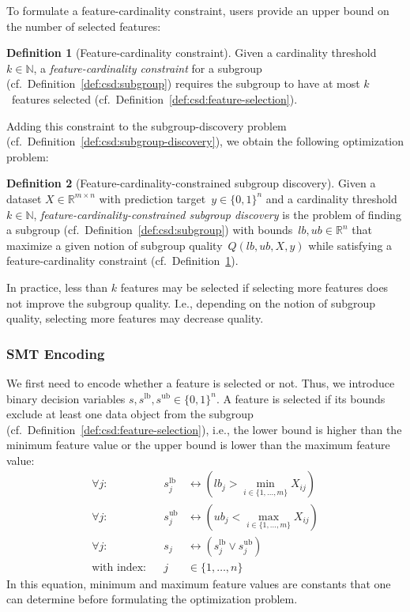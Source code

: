 \documentclass{article}
\theoremstyle{definition}
\newtheorem{definition}{Definition}
\begin{document}
To formulate a feature-cardinality constraint, users provide an upper bound on the number of selected features:
%
\begin{definition}[Feature-cardinality constraint]
	Given a cardinality threshold $k \in \mathbb{N}$,
	a \emph{feature-cardinality constraint} for a subgroup (cf.~Definition~\ref{def:csd:subgroup}) requires the subgroup to have at most $k$~features selected (cf.~Definition~\ref{def:csd:feature-selection}).
	\label{def:csd:feature-cardinality-constraint}
\end{definition}
%
Adding this constraint to the subgroup-discovery problem (cf.~Definition~\ref{def:csd:subgroup-discovery}), we obtain the following optimization problem:
%
\begin{definition}[Feature-cardinality-constrained subgroup discovery]
	Given a dataset $X \in \mathbb{R}^{m \times n}$ with prediction target~$y \in \{0, 1\}^n$
	and a cardinality threshold~$k \in \mathbb{N}$,
	\emph{feature-cardinality-constrained subgroup discovery} is the problem of finding a subgroup (cf.~Definition~\ref{def:csd:subgroup}) with bounds~$\mathit{lb}, \mathit{ub} \in \mathbb{R}^n$ that maximize a given notion of subgroup quality~$Q(\mathit{lb}, \mathit{ub}, X, y)$ while satisfying a feature-cardinality constraint (cf.~Definition~\ref{def:csd:feature-cardinality-constraint}).
	\label{def:csd:feature-cardinality-constrained-subgroup-discovery}
\end{definition}
%
In practice, less than $k$ features may be selected if selecting more features does not improve the subgroup quality.
I.e., depending on the notion of subgroup quality, selecting more features may decrease quality.

\subsubsection{SMT Encoding}
\label{sec:csd:approach:cardinality:smt}

We first need to encode whether a feature is selected or not.
Thus, we introduce binary decision variables $s, s^{\text{lb}}, s^{\text{ub}} \in \{0, 1\}^n$.
A feature is selected if its bounds exclude at least one data object from the subgroup (cf.~Definition~\ref{def:csd:feature-selection}), i.e., the lower bound is higher than the minimum feature value or the upper bound is lower than the maximum feature value:
%
\begin{equation}
	\begin{aligned}
		\forall j: & & s^{\text{lb}}_j &\leftrightarrow \left( \mathit{lb}_j > \min_{i \in \{1, \dots, m\}} X_{ij} \right) \\
		\forall j: & &s^{\text{ub}}_j &\leftrightarrow \left( \mathit{ub}_j < \max_{i \in \{1, \dots, m\}} X_{ij} \right) \\
		\forall j: & & s_j &\leftrightarrow \left( s^{\text{lb}}_j \lor s^{\text{ub}}_j \right) \\
		\text{with index:} & & j &\in \{1, \dots, n\}
	\end{aligned}
	\label{eq:csd:smt-constraint-feature-selection}
\end{equation}
%
In this equation, minimum and maximum feature values are constants that one can determine before formulating the optimization problem.
\end{document}
